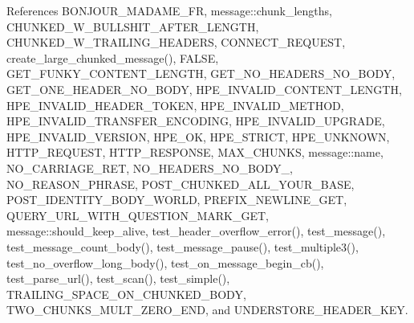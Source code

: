 References B\+O\+N\+J\+O\+U\+R\+\_\+\+M\+A\+D\+A\+M\+E\+\_\+\+FR, message\+::chunk\+\_\+lengths, C\+H\+U\+N\+K\+E\+D\+\_\+\+W\+\_\+\+B\+U\+L\+L\+S\+H\+I\+T\+\_\+\+A\+F\+T\+E\+R\+\_\+\+L\+E\+N\+G\+TH, C\+H\+U\+N\+K\+E\+D\+\_\+\+W\+\_\+\+T\+R\+A\+I\+L\+I\+N\+G\+\_\+\+H\+E\+A\+D\+E\+RS, C\+O\+N\+N\+E\+C\+T\+\_\+\+R\+E\+Q\+U\+E\+ST, create\+\_\+large\+\_\+chunked\+\_\+message(), F\+A\+L\+SE, G\+E\+T\+\_\+\+F\+U\+N\+K\+Y\+\_\+\+C\+O\+N\+T\+E\+N\+T\+\_\+\+L\+E\+N\+G\+TH, G\+E\+T\+\_\+\+N\+O\+\_\+\+H\+E\+A\+D\+E\+R\+S\+\_\+\+N\+O\+\_\+\+B\+O\+DY, G\+E\+T\+\_\+\+O\+N\+E\+\_\+\+H\+E\+A\+D\+E\+R\+\_\+\+N\+O\+\_\+\+B\+O\+DY, H\+P\+E\+\_\+\+I\+N\+V\+A\+L\+I\+D\+\_\+\+C\+O\+N\+T\+E\+N\+T\+\_\+\+L\+E\+N\+G\+TH, H\+P\+E\+\_\+\+I\+N\+V\+A\+L\+I\+D\+\_\+\+H\+E\+A\+D\+E\+R\+\_\+\+T\+O\+K\+EN, H\+P\+E\+\_\+\+I\+N\+V\+A\+L\+I\+D\+\_\+\+M\+E\+T\+H\+OD, H\+P\+E\+\_\+\+I\+N\+V\+A\+L\+I\+D\+\_\+\+T\+R\+A\+N\+S\+F\+E\+R\+\_\+\+E\+N\+C\+O\+D\+I\+NG, H\+P\+E\+\_\+\+I\+N\+V\+A\+L\+I\+D\+\_\+\+U\+P\+G\+R\+A\+DE, H\+P\+E\+\_\+\+I\+N\+V\+A\+L\+I\+D\+\_\+\+V\+E\+R\+S\+I\+ON, H\+P\+E\+\_\+\+OK, H\+P\+E\+\_\+\+S\+T\+R\+I\+CT, H\+P\+E\+\_\+\+U\+N\+K\+N\+O\+WN, H\+T\+T\+P\+\_\+\+R\+E\+Q\+U\+E\+ST, H\+T\+T\+P\+\_\+\+R\+E\+S\+P\+O\+N\+SE, M\+A\+X\+\_\+\+C\+H\+U\+N\+KS, message\+::name, N\+O\+\_\+\+C\+A\+R\+R\+I\+A\+G\+E\+\_\+\+R\+ET, N\+O\+\_\+\+H\+E\+A\+D\+E\+R\+S\+\_\+\+N\+O\+\_\+\+B\+O\+D\+Y\+\_, N\+O\+\_\+\+R\+E\+A\+S\+O\+N\+\_\+\+P\+H\+R\+A\+SE, P\+O\+S\+T\+\_\+\+C\+H\+U\+N\+K\+E\+D\+\_\+\+A\+L\+L\+\_\+\+Y\+O\+U\+R\+\_\+\+B\+A\+SE, P\+O\+S\+T\+\_\+\+I\+D\+E\+N\+T\+I\+T\+Y\+\_\+\+B\+O\+D\+Y\+\_\+\+W\+O\+R\+LD, P\+R\+E\+F\+I\+X\+\_\+\+N\+E\+W\+L\+I\+N\+E\+\_\+\+G\+ET, Q\+U\+E\+R\+Y\+\_\+\+U\+R\+L\+\_\+\+W\+I\+T\+H\+\_\+\+Q\+U\+E\+S\+T\+I\+O\+N\+\_\+\+M\+A\+R\+K\+\_\+\+G\+ET, message\+::should\+\_\+keep\+\_\+alive, test\+\_\+header\+\_\+overflow\+\_\+error(), test\+\_\+message(), test\+\_\+message\+\_\+count\+\_\+body(), test\+\_\+message\+\_\+pause(), test\+\_\+multiple3(), test\+\_\+no\+\_\+overflow\+\_\+long\+\_\+body(), test\+\_\+on\+\_\+message\+\_\+begin\+\_\+cb(), test\+\_\+parse\+\_\+url(), test\+\_\+scan(), test\+\_\+simple(), T\+R\+A\+I\+L\+I\+N\+G\+\_\+\+S\+P\+A\+C\+E\+\_\+\+O\+N\+\_\+\+C\+H\+U\+N\+K\+E\+D\+\_\+\+B\+O\+DY, T\+W\+O\+\_\+\+C\+H\+U\+N\+K\+S\+\_\+\+M\+U\+L\+T\+\_\+\+Z\+E\+R\+O\+\_\+\+E\+ND, and U\+N\+D\+E\+R\+S\+T\+O\+R\+E\+\_\+\+H\+E\+A\+D\+E\+R\+\_\+\+K\+EY.


